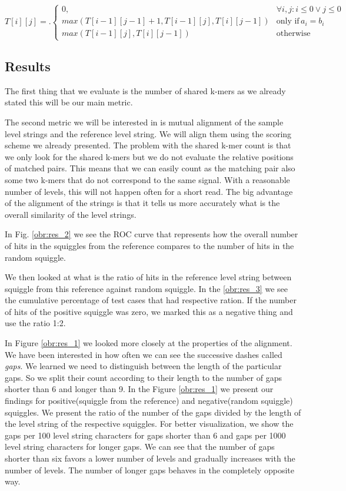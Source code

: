 \[
T[i][j] = \bigl.
  \begin{cases}
    0, & \forall i,j : i\leq 0 \lor j\leq 0 \\
    max(T[i-1][j-1] + 1, T[i-1][j], T[i][j-1]) & \text{only if} \, a_i = b_i \\ 
    max(T[i-1][j], T[i][j-1]) & \text{otherwise}
  \end{cases}
\]

\subsection{Results}

The first thing that we evaluate is the number of shared k-mers as we already
stated this will be our main metric.

The second metric we will be interested in is mutual alignment of the sample
level strings and the reference level string. We will align them using the scoring
scheme we already presented. The problem with the shared k-mer count is that we only look
for the shared k-mers but we do not evaluate the relative positions of matched pairs.
This means that we can easily count as the matching pair also some two k-mers that
do not correspond to the same signal. With a reasonable number of levels, this will
not happen often for a short read. The big advantage of the alignment of the strings
is that it tells us more accurately what is the overall similarity of the level strings.

In Fig. \ref{obr:res_2} we see the ROC curve that represents how the overall number
of hits in the squiggles from the reference compares to the number of hits in the
random squiggle.

We then looked at what is the ratio of hits in the reference level string between squiggle
from this reference against random squiggle. In the \ref{obr:res_3} we see the cumulative percentage
of test cases that had respective ration. If the number of hits of the positive squiggle
was zero, we marked this as a negative thing and use the ratio 1:2.

In Figure \ref{obr:res_1} we looked more closely at the properties of the alignment. We
have been interested in how often we can see the successive dashes called \textit{gaps}.
We learned we need to distinguish between the length of the particular gaps. So we split
their count according to their length to the number of gaps shorter than 6 and longer than 9.
In the Figure \ref{obr:res_1} we present our findings for positive(squiggle from the reference)
and negative(random squiggle) squiggles. We present the ratio of the number of the gaps divided
by the length of the level string of the respective squiggles. For better visualization,
we show the gaps per 100 level string characters for gaps shorter than 6 and gaps
per 1000 level string characters for longer gaps. We can see that the number of gaps
shorter than six favors a lower number of levels and gradually increases with the number
of levels. The number of longer gaps behaves in the completely opposite way. 

